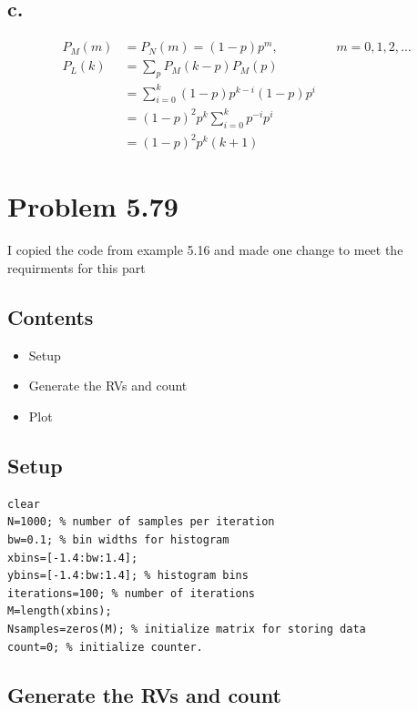 \documentclass[12pt]{article}
\begin{document}
\subsection{c.}
\begin{align*}
  P_M(m) &= P_N(m) = (1-p)p^m, & &  m = 0,1,2,\dots \\
  P_L(k) &= \sum_p P_M(k-p)P_M(p) \\
  &= \sum_{i=0}^k (1-p)p^{k-i}(1-p)p^i \\
  &= (1-p)^2p^k\sum_{i=0}^k p^{-i}p^i \\
  &= (1-p)^2p^k(k+1)
\end{align*}
\section*{Problem 5.79}

\begin{par}
I copied the code from example 5.16 and made one change to meet the requirments for this part
\end{par} \vspace{1em}

\subsection*{Contents}

\begin{itemize}
\setlength{\itemsep}{-1ex}
   \item Setup
   \item Generate the RVs and count
   \item Plot
\end{itemize}


\subsection*{Setup}

\begin{verbatim}
clear
N=1000; % number of samples per iteration
bw=0.1; % bin widths for histogram
xbins=[-1.4:bw:1.4];
ybins=[-1.4:bw:1.4]; % histogram bins
iterations=100; % number of iterations
M=length(xbins);
Nsamples=zeros(M); % initialize matrix for storing data
count=0; % initialize counter.
\end{verbatim}


\subsection*{Generate the RVs and count}
\end{document}
